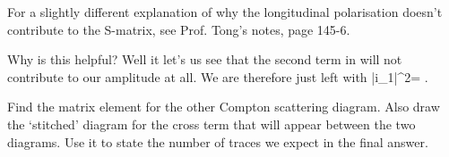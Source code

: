 \br 
    For a slightly different explanation of why the longitudinal polarisation doesn't contribute to the S-matrix, see Prof. Tong's notes, page 145-6.
\er 

Why is this helpful? Well it let's us see that the second term in  will not contribute to our amplitude at all. We are therefore just left with 
\bse 
    \big\la |i\cM_1|^2\big\ra =  .
\ese

\bbox 
    Find the matrix element for the other Compton scattering diagram. Also draw the `stitched' diagram for the cross term that will appear between the two diagrams. Use it to state the number of traces we expect in the final answer.
\ebox 